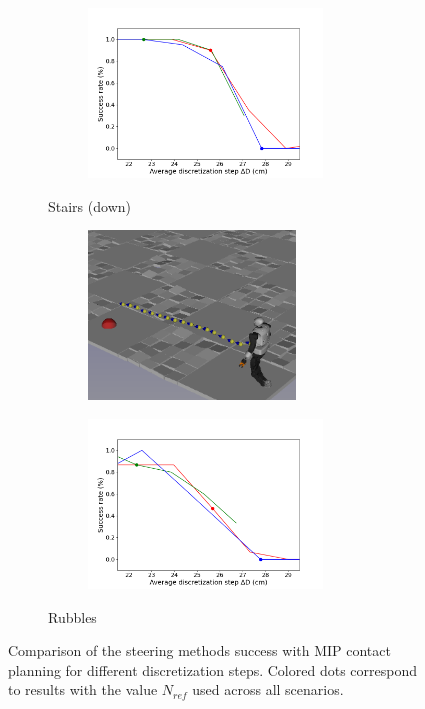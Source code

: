 \begin{figure}[h!]
\begin{subfigure}{0.9\linewidth}
\begin{subfigure}{0.48\linewidth}
        \end{subfigure}
        \begin{subfigure}{0.48\linewidth}
            \includegraphics[trim={0cm 0cm 2cm 1.8cm}, clip,width=\textwidth,height=4.5cm]{Figures/Chapter_MIP_SL1M/res_mip/MIP_stairs/FIGURE_MIP_STAIRS_DOWN.png}
        \end{subfigure}
        \caption{Stairs (down)}
        \label{fig:mip:minimizing_basic:1}
    \end{subfigure}
    \begin{subfigure}{0.9\linewidth}
        \centering
        \begin{subfigure}{0.48\linewidth}
            \includegraphics[trim={0cm 0cm 0cm 0cm},clip,width=\textwidth,height=4.5cm]{Figures/Chapter_MIP_SL1M/res_mip/scenario_rubbles.png}
        \end{subfigure}
        \begin{subfigure}{0.48\linewidth}
            \includegraphics[trim={0cm 0cm 2cm 1.8cm}, clip,width=\textwidth,height=4.5cm]{Figures/Chapter_MIP_SL1M/res_mip/MIP_res_rubbles/FIGURE_MIP_RUBBLES_2.png}
        \end{subfigure}
        \caption{Rubbles}
        \label{fig:mip:minimizing_basic:1}
    \end{subfigure}
    \caption{Comparison of the steering methods success with MIP contact planning for different discretization steps. Colored dots correspond to results with the value $N_{ref}$ used across all scenarios.}
    \label{fig:mip:minimizing_basic}
\end{figure}
